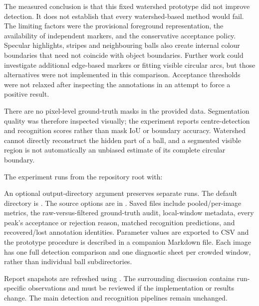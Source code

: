 The measured conclusion is that this fixed watershed prototype did not
improve detection. It does not establish that every watershed-based
method would fail. The limiting factors were the provisional foreground
representation, the availability of independent markers, and the
conservative acceptance policy. Specular highlights, stripes and
neighbouring balls also create internal colour boundaries that need
not coincide with object boundaries. Further work could investigate
additional edge-based markers or fitting visible circular arcs, but
those alternatives were not implemented in this comparison. Acceptance
thresholds were not relaxed after inspecting the annotations in an
attempt to force a positive result.

There are no pixel-level ground-truth masks in the provided data.
Segmentation quality was therefore inspected visually; the experiment
reports centre-detection and recognition scores rather than mask IoU
or boundary accuracy. Watershed cannot directly reconstruct the hidden
part of a ball, and a segmented visible region is not automatically
an unbiased estimate of its complete circular boundary.

The experiment runs from the repository root with:
\begin{quote}
\end{quote}
An optional output-directory argument preserves separate runs. The
default directory is .
The source options are in .
Saved files include pooled/per-image metrics, the raw-versus-filtered
ground-truth audit, local-window metadata, every peak's acceptance or
rejection reason, matched recognition predictions, and recovered/lost
annotation identities. Parameter values are exported to CSV and the
prototype procedure is described in a companion Markdown file.
Each image has one full detection comparison and one diagnostic sheet
per crowded window, rather than individual ball subdirectories.

Report snapshots are refreshed using
. The surrounding
discussion contains run-specific observations and must be reviewed if
the implementation or results change. The main detection and recognition
pipelines remain unchanged.
